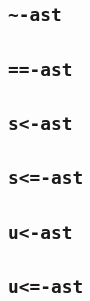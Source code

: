 \subsection{\texttt{\~{}-ast}}
\subsection{\texttt{==-ast}}
\subsection{\texttt{s<-ast}}
\subsection{\texttt{s<=-ast}}
\subsection{\texttt{u<-ast}}
\subsection{\texttt{u<=-ast}}
